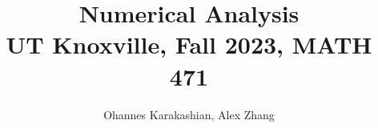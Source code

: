 \documentclass[math]{amznotes}
\title{\textbf{Numerical Analysis}\\
\large UT Knoxville, Fall 2023, MATH 471}
\author{Ohannes Karakashian, Alex Zhang}
\begin{document}
\maketitle
\tableofcontents






\amzindex
\end{document}
